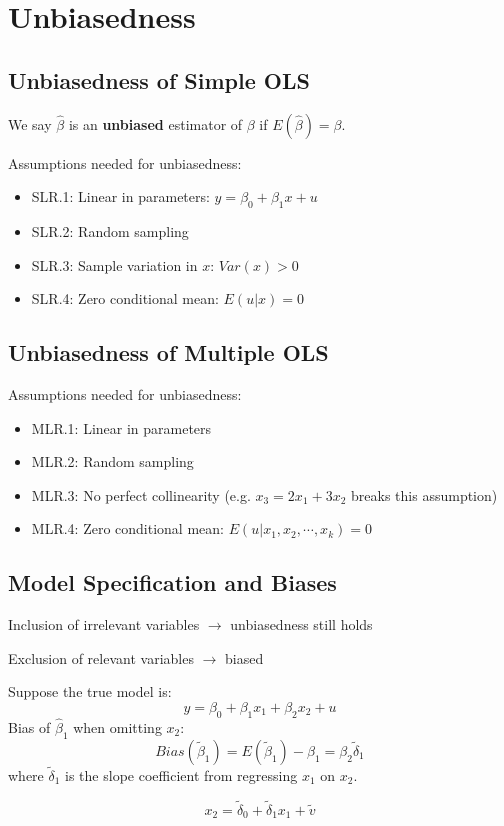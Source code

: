 \documentclass[11pt,a4paper]{article}
\begin{document}
\section{Unbiasedness}
\subsection{Unbiasedness of Simple OLS}
We say $\hat{\beta}$ is an \textbf{unbiased} estimator of $\beta$ if $E(\hat{\beta}) = \beta$. \par
Assumptions needed for unbiasedness:
\begin{itemize}
    \item SLR.1: Linear in parameters: $y = \beta_0 + \beta_1 x + u$
    \item SLR.2: Random sampling
    \item SLR.3: Sample variation in $x$: $Var(x) > 0$
    \item SLR.4: Zero conditional mean: $E(u|x) = 0$ 
\end{itemize}

\subsection{Unbiasedness of Multiple OLS}
Assumptions needed for unbiasedness:
\begin{itemize}
    \item MLR.1: Linear in parameters
    \item MLR.2: Random sampling
    \item MLR.3: No perfect collinearity (e.g. $x_3 = 2 x_1 + 3 x_2$ breaks this assumption)
    \item MLR.4: Zero conditional mean: $E(u|x_1, x_2, \cdots, x_k) = 0$
\end{itemize}

\subsection{Model Specification and Biases}
Inclusion of irrelevant variables $\rightarrow$ unbiasedness still holds \par
Exclusion of relevant variables $\rightarrow$ biased \par
Suppose the true model is:
\[
y = \beta_0 + \beta_1 x_1 + \beta_2 x_2 + u
\]
Bias of $\hat{\beta}_1$ when omitting $x_2$:
\[
Bias(\tilde{\beta}_1) = E(\tilde{\beta}_1) - \beta_1 = \beta_2 \tilde{\delta}_1
\]
where $\tilde{\delta}_1$ is the slope coefficient from regressing $x_1$ on $x_2$. \par
\[
x_2 = \tilde{\delta}_0 + \tilde{\delta}_1 x_1 + \tilde{v}
\]
\end{document}
